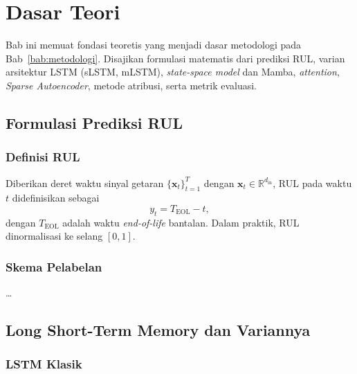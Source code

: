 
\chapter{Dasar Teori}
\label{bab:dasar-teori}

Bab ini memuat fondasi teoretis yang menjadi dasar metodologi pada
Bab~\ref{bab:metodologi}. Disajikan formulasi matematis dari prediksi
RUL, varian arsitektur LSTM (sLSTM, mLSTM), \emph{state-space model}
dan Mamba, \emph{attention}, \emph{Sparse Autoencoder}, metode
atribusi, serta metrik evaluasi.

\section{Formulasi Prediksi RUL}
\label{subsec:bab3_rul}

\subsection{Definisi RUL}
\label{subsec:bab3_def_rul}

Diberikan deret waktu sinyal getaran $\{\mathbf{x}_t\}_{t=1}^{T}$
dengan $\mathbf{x}_t \in \mathbb{R}^{d_{\text{in}}}$, RUL pada waktu
$t$ didefinisikan sebagai
\begin{equation}
y_t = T_{\text{EOL}} - t,
\label{eq:bab3_rul_def}
\end{equation}
dengan $T_{\text{EOL}}$ adalah waktu \emph{end-of-life} bantalan.
Dalam praktik, RUL dinormalisasi ke selang $[0,1]$.

\subsection{Skema Pelabelan}
\label{subsec:bab3_label}

\dots

\section{Long Short-Term Memory dan Variannya}
\label{subsec:bab3_lstm}

\subsection{LSTM Klasik}
\label{subsec:bab3_lstm_classic}

